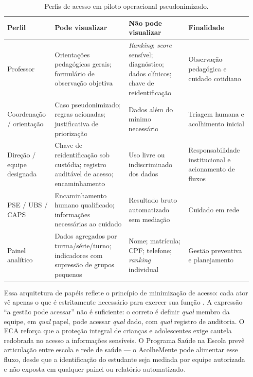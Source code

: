 \documentclass[
    12pt,
    openright,
    oneside,
    a4paper,
    english,
    brazil
]{abntex2}
\begin{document}
\begin{table}[H]
\centering
\caption{Perfis de acesso em piloto operacional pseudonimizado.}
\label{tab:perfis_acesso}
\begin{tabular}{p{2.2cm}p{4cm}p{3.8cm}p{3cm}}
\toprule
\textbf{Perfil} & \textbf{Pode visualizar} & \textbf{N\~ao pode visualizar} & \textbf{Finalidade} \\
\midrule
Professor &
Orienta\c{c}\~oes pedag\'ogicas gerais; formul\'ario de observa\c{c}\~ao objetiva &
\textit{Ranking}; \textit{score} sens\'ivel; diagn\'ostico; dados cl\'inicos; chave de reidentifica\c{c}\~ao &
Observa\c{c}\~ao pedag\'ogica e cuidado cotidiano \\
\midrule
Coordena\c{c}\~ao / orienta\c{c}\~ao &
Caso pseudonimizado; regras acionadas; justificativa de prioriza\c{c}\~ao &
Dados al\'em do m\'inimo necess\'ario &
Triagem humana e acolhimento inicial \\
\midrule
Dire\c{c}\~ao / equipe designada &
Chave de reidentifica\c{c}\~ao sob cust\'odia; registro audit\'avel de acesso; encaminhamento &
Uso livre ou indiscriminado dos dados &
Responsabilidade institucional e acionamento de fluxos \\
\midrule
PSE / UBS / CAPS &
Encaminhamento humano qualificado; informa\c{c}\~oes necess\'arias ao cuidado &
Resultado bruto automatizado sem media\c{c}\~ao &
Cuidado em rede \\
\midrule
Painel anal\'itico &
Dados agregados por turma/s\'erie/turno; indicadores com supress\~ao de grupos pequenos &
Nome; matr\'icula; CPF; telefone; \textit{ranking} individual &
Gest\~ao preventiva e planejamento \\
\bottomrule
\end{tabular}
\end{table}

Essa arquitetura de pap\'eis reflete o princ\'ipio de minimiza\c{c}\~ao de acesso: cada ator v\^e apenas o que \'e estritamente necess\'ario para exercer sua fun\c{c}\~ao \cite{brasil_lgpd_2018}. A express\~ao ``a gest\~ao pode acessar'' n\~ao \'e suficiente: o correto \'e definir \textit{qual} membro da equipe, em \textit{qual} papel, pode acessar \textit{qual} dado, com \textit{qual} registro de auditoria. O ECA \cite{brasil_eca_1990} refor\c{c}a que a prote\c{c}\~ao integral de crian\c{c}as e adolescentes exige cautela redobrada no acesso a informa\c{c}\~oes sens\'iveis. O Programa Sa\'ude na Escola \cite{brasil_pse_2007} prev\^e articula\c{c}\~ao entre escola e rede de sa\'ude --- o AcolheMente pode alimentar esse fluxo, desde que a identifica\c{c}\~ao do estudante seja mediada por equipe autorizada e n\~ao exposta em qualquer painel ou relat\'orio automatizado.
\end{document}
